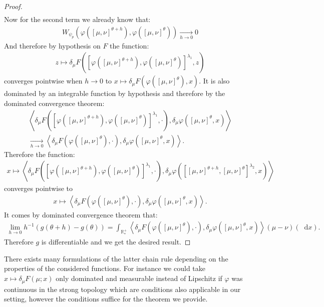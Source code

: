 \documentclass[11pt,a4paper]{article}
\newcommand{\RRP}{\mathbb{R}^+_*}
\newcommand{\brac}[1]{\left\langle#1\right\rangle}
\newcommand{\dd}{\mathop{}\!\mathrm{d}}
\begin{document}
\begin{proof}
\begin{multline*}
    \end{multline*}
    Now for the second term we already know that:
    \begin{align*}
        W_{\psi_p}\left(\varphi\left([\mu,\nu]^{\theta + h}\right), \varphi\left([\mu,\nu]^{\theta}\right) \right) \xrightarrow[h \to 0]{} 0
    \end{align*}
    And therefore by hypothesis on $F$ the function:
    \begin{align*}
        z \mapsto \delta_\mu F\left(\left[\varphi\left([\mu,\nu]^{\theta + h}\right),\varphi\left([\mu,\nu]^{\theta}\right)\right]^{\lambda_1}, z\right)
    \end{align*}
    converges pointwise when $h \to 0$ to $x \mapsto \delta_\mu F\left(\varphi\left([\mu,\nu]^{\theta}\right), x\right)$. It is also dominated by an integrable function by hypothesis and therefore by the dominated convergence theorem:
    \begin{multline*}
        \brac{\delta_\mu F\left(\left[\varphi\left([\mu,\nu]^{\theta + h}\right),\varphi\left([\mu,\nu]^{\theta}\right)\right]^{\lambda_1}, \cdot \right) ,\delta_\mu \varphi\left([\mu,\nu]^{\theta } ,x\right)} \\
        \xrightarrow[h \to 0]{} \brac{\delta_\mu F\left(\varphi\left([\mu,\nu]^{\theta}\right), \cdot \right) ,\delta_\mu \varphi\left([\mu,\nu]^{\theta } ,x\right)}.
    \end{multline*}
    Therefore the function:
    \begin{align*}
        x \mapsto \brac{\delta_\mu F\left(\left[\varphi\left([\mu,\nu]^{\theta + h}\right),\varphi\left([\mu,\nu]^{\theta}\right)\right]^{\lambda_1}, \cdot \right),\delta_\mu \varphi\left(\left[ [\mu,\nu]^{\theta + h}, [\mu,\nu]^{\theta }\right]^{\lambda_2} ,x\right)}
    \end{align*}
    converges pointwise to
    \begin{align*}
        x \mapsto \brac{\delta_\mu F\left(\varphi\left([\mu,\nu]^{\theta}\right), \cdot \right),\delta_\mu \varphi\left([\mu,\nu]^{\theta } ,x\right)}.
    \end{align*}
    It comes by dominated convergence theorem that:
    \begin{align*}
        \lim\limits_{h \to 0} h^{-1}\left(g(\theta + h) - g(\theta)\right) = \int_{\RRP} \brac{\delta_\mu F\left(\varphi\left([\mu,\nu]^{\theta}\right), \cdot \right),\delta_\mu \varphi\left([\mu,\nu]^{\theta } ,x\right)}(\mu -\nu)(\dd x).
    \end{align*}
    Therefore $g$ is differentiable and we get the desired result.
\end{proof}
There exists many formulations of the latter chain rule depending on the properties of the considered functions. For instance we could take $x \mapsto \delta_\mu F(\mu;x)$ only dominated and measurable instead of Lipschitz if $\varphi$ was continuous in the strong topology which are conditions also applicable in our setting, however the conditions suffice for the theorem we provide.
\end{document}
